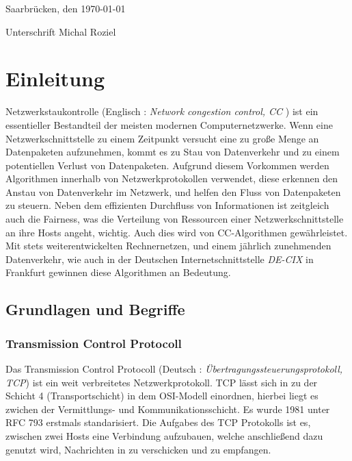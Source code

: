 \documentclass[paper=a4,fontsize=12pt,ngerman]{scrartcl}
\begin{document}
Saarbrücken, den \today

\smallskip
Unterschrift  Michal Roziel




\clearpage
\tableofcontents 

\clearpage
{}



\section{Einleitung}

Netzwerkstaukontrolle (Englisch : \textit{ Network congestion control, CC }) ist ein essentieller Bestandteil der 
meisten modernen Computernetzwerke. 
Wenn eine Netzwerkschnittstelle zu einem Zeitpunkt versucht eine zu große Menge an Datenpaketen aufzunehmen,
kommt es zu Stau von Datenverkehr und zu einem potentiellen Verlust von Datenpaketen.
Aufgrund diesem Vorkommen werden Algorithmen innerhalb von Netzwerkprotokollen verwendet, diese erkennen den Anstau von Datenverkehr im Netzwerk,
und helfen den Fluss von Datenpaketen zu steuern. Neben dem effizienten Durchfluss von Informationen ist zeitgleich auch die Fairness, 
was die Verteilung von Ressourcen einer Netzwerkschnittstelle an ihre Hosts angeht, wichtig. Auch dies wird von CC-Algorithmen gewährleistet.
\newline
Mit stets weiterentwickelten Rechnernetzen, und einem jährlich zunehmenden Datenverkehr, wie auch in der Deutschen Internetschnittstelle
\textit{DE-CIX}\cite{DE-CIX2025} in Frankfurt gewinnen diese Algorithmen an Bedeutung. 





\subsection{Grundlagen und Begriffe}

\subsubsection{Transmission Control Protocoll}

Das Transmission Control Protocoll (Deutsch : \textit{Übertragungssteuerungsprotokoll, TCP}) ist ein weit verbreitetes Netzwerkprotokoll. 
TCP lässt sich in zu der Schicht 4 (Transportschicht) in dem OSI-Modell einordnen, hierbei liegt es zwichen der Vermittlungs- und Kommunikationsschicht.
\newline Es wurde 1981 unter RFC 793 erstmals standarisiert.   %
\newline
Die Aufgabes des TCP Protokolls ist es, zwischen zwei Hosts eine Verbindung aufzubauen, welche anschließend dazu genutzt wird,  
Nachrichten in zu verschicken und zu empfangen.
\end{document}
